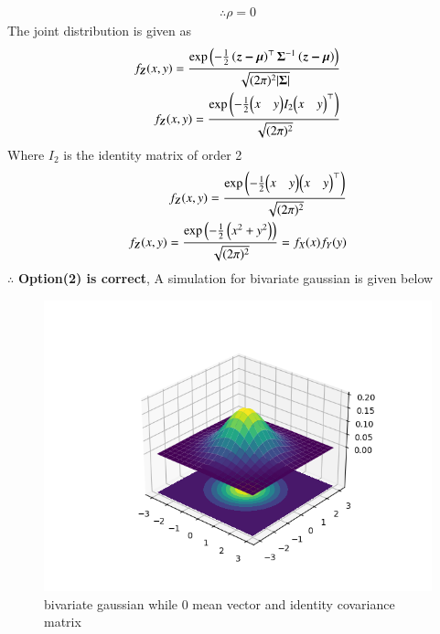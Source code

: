 \documentclass[journal,12pt,twocolumn]{IEEEtran}
\begin{document}
\begin{enumerate}
\begin{align}
\therefore \rho=0\label{eq:rho}
\end{align}
The joint distribution is given as
\begin{align}
f_{\boldsymbol{Z}}(x,y)=\frac{\text{exp}\left(-\frac{1}{2}\left(\boldsymbol{z-\mu}\right)^\top\boldsymbol{\Sigma}^{-1}\left(\boldsymbol{z-\mu}\right)\right)}{\sqrt{(2\pi)^2\vert\boldsymbol{\Sigma}\vert}}\\
f_{\boldsymbol{Z}}(x,y)=\frac{\text{exp}\left(-\frac{1}{2}{\begin{pmatrix} x &y\end{pmatrix}} I_2{\begin{pmatrix} x &y\end{pmatrix}}^\top\right)}{\sqrt{(2\pi)^2}}
\end{align}
Where $I_2$ is the identity matrix of order 2
\begin{align}
f_{\boldsymbol{Z}}(x,y)=\frac{\text{exp}\left(-\frac{1}{2}{\begin{pmatrix} x &y\end{pmatrix}} {\begin{pmatrix} x &y\end{pmatrix}}^\top\right)}{\sqrt{(2\pi)^2}}\\
f_{\boldsymbol{Z}}(x,y)=\frac{\text{exp}\left(-\frac{1}{2}\left(x^2+y^2\right)\right)}{\sqrt{(2\pi)^2}}=f_X(x)f_Y(y)
\end{align}
$\therefore$ \textbf{Option(2) is correct}, A simulation for bivariate gaussian is given below
\begin{figure}[H]
\centering
\includegraphics[width=\linewidth]{figure/plot}
\caption{bivariate gaussian while 0 mean vector and identity covariance matrix}

\end{figure}
\end{enumerate}
\end{document}
